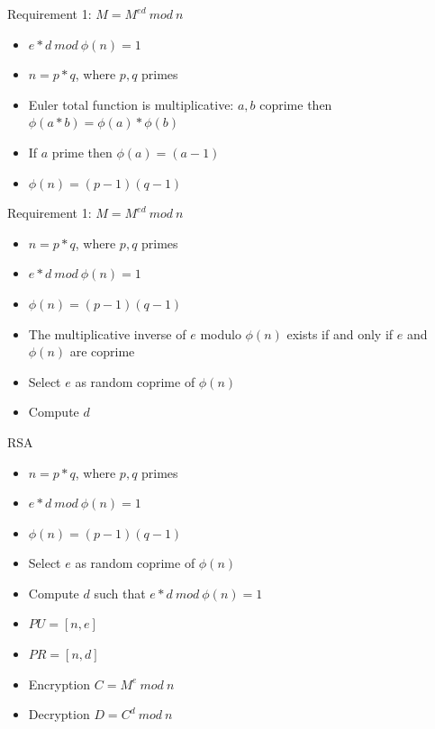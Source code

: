 \documentclass{beamer}
\begin{document}
\begin{frame}{Requirement 1: $M = M^{ed}\ mod\ n$}
  \begin{itemize}
    \item $e*d\ mod\ \phi(n) = 1$
    \item $n=p*q$, where $p,q$ primes 
    \item<2-> Euler total function is multiplicative: $a,b$ coprime then $\phi(a*b) = \phi(a)*\phi(b)$
    \item<3-> If $a$ prime then $\phi(a) = (a-1)$ 
    \item<4-> $\phi(n) = (p-1)(q-1)$
  \end{itemize}
\end{frame}

\begin{frame}{Requirement 1: $M = M^{ed}\ mod\ n$}
  \begin{itemize}
    \item $n=p*q$, where $p,q$ primes 
    \item $e*d\ mod\ \phi(n) = 1$
    \item $\phi(n) = (p-1)(q-1)$
    \item<2-> The multiplicative inverse of $e$ modulo $\phi(n)$ exists if and only if $e$ and $\phi(n)$ are coprime
    \item<3-> Select $e$ as random coprime of $\phi(n)$
    \item<4-> Compute $d$
  \end{itemize}
\end{frame}

\begin{frame}{RSA}
  \begin{itemize}
    \item $n=p*q$, where $p,q$ primes 
    \item $e*d\ mod\ \phi(n) = 1$
    \item $\phi(n) = (p-1)(q-1)$
    \item Select $e$ as random coprime of $\phi(n)$
    \item Compute $d$ such that $e*d\ mod\ \phi(n) = 1$
    \item $PU = [n,e]$ 
    \item $PR = [n,d]$
    \item Encryption $C = M^e\ mod\ n$
    \item Decryption $D = C^d\ mod\ n$
  \end{itemize}
\end{frame}
\end{document}
